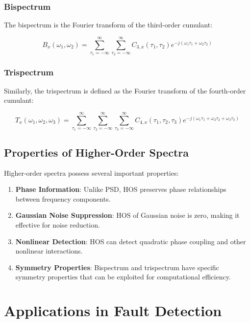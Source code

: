 \subsubsection{Bispectrum}

The bispectrum is the Fourier transform of the third-order cumulant:

\begin{equation}
B_x(\omega_1, \omega_2) = \sum_{\tau_1=-\infty}^{\infty} \sum_{\tau_2=-\infty}^{\infty} C_{3,x}(\tau_1, \tau_2) e^{-j(\omega_1\tau_1 + \omega_2\tau_2)}
\end{equation}

\subsubsection{Trispectrum}

Similarly, the trispectrum is defined as the Fourier transform of the fourth-order cumulant:

\begin{equation}
T_x(\omega_1, \omega_2, \omega_3) = \sum_{\tau_1=-\infty}^{\infty} \sum_{\tau_2=-\infty}^{\infty} \sum_{\tau_3=-\infty}^{\infty} C_{4,x}(\tau_1, \tau_2, \tau_3) e^{-j(\omega_1\tau_1 + \omega_2\tau_2 + \omega_3\tau_3)}
\end{equation}

\subsection{Properties of Higher-Order Spectra}

Higher-order spectra possess several important properties:

\begin{enumerate}
    \item \textbf{Phase Information}: Unlike PSD, HOS preserves phase relationships between frequency components.
    \item \textbf{Gaussian Noise Suppression}: HOS of Gaussian noise is zero, making it effective for noise reduction.
    \item \textbf{Nonlinear Detection}: HOS can detect quadratic phase coupling and other nonlinear interactions.
    \item \textbf{Symmetry Properties}: Bispectrum and trispectrum have specific symmetry properties that can be exploited for computational efficiency.
\end{enumerate}

\section{Applications in Fault Detection}


